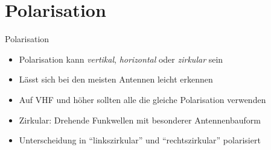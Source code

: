 \section{Polarisation}
\label{section:polarisation}
\begin{frame}{Polarisation}
    \begin{itemize}
        \item Polarisation kann \emph{vertikal}, \emph{horizontal} oder \emph{zirkular} sein
        \item Lässt sich bei den meisten Antennen leicht erkennen
        \item Auf VHF und höher sollten alle die gleiche Polarisation verwenden
        \item Zirkular: Drehende Funkwellen mit besonderer Antennenbauform
        \item Unterscheidung in \enquote{linkszirkular} und \enquote{rechtszirkular} polarisiert
    \end{itemize}
\end{frame}

